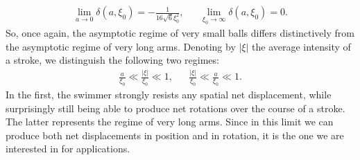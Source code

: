 \begin{eqnarray}
\lim_{a \to 0} \delta(a, \xi_0) = -\frac{1}{16 \sqrt{6} \xi_0^2}, & & \lim_{\xi_0 \to \infty} \delta(a, \xi_0) = 0.
\end{eqnarray}
So, once again, the asymptotic regime of very small balls differs distinctively from the asymptotic regime of very long arms. Denoting by $|\xi|$ the average intensity of a stroke, we distinguish the following two regimes:
\begin{eqnarray}
\frac{a}{\xi_0} \ll \frac{|\xi|}{\xi_0} \ll 1, & & \frac{|\xi|}{\xi_0}  \ll \frac{a}{\xi_0} \ll 1.
\end{eqnarray}
In the first, the swimmer strongly resists any spatial net displacement, while surprisingly still being able to produce net rotations over the course of a stroke. The latter represents the regime of very long arms. Since in this limit we can produce both net displacements in position and in rotation, it is the one we are interested in for applications.


